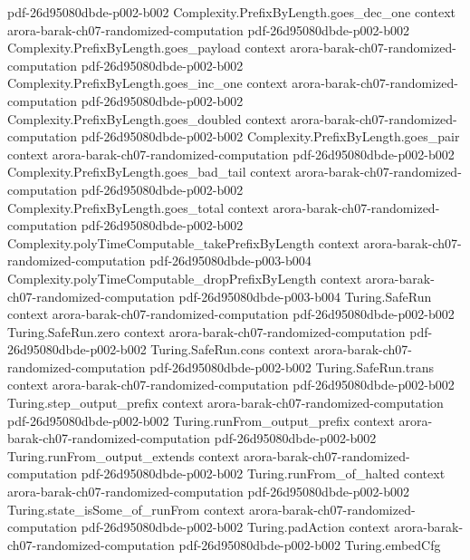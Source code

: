 \begin{theorem}
  {pdf-26d95080dbde-p002-b002}
\proofstep
  {Complexity.PrefixByLength.goes_dec_one}
  {context}
  {arora-barak-ch07-randomized-computation}
  {pdf-26d95080dbde-p002-b002}
\proofstep
  {Complexity.PrefixByLength.goes_payload}
  {context}
  {arora-barak-ch07-randomized-computation}
  {pdf-26d95080dbde-p002-b002}
\proofstep
  {Complexity.PrefixByLength.goes_inc_one}
  {context}
  {arora-barak-ch07-randomized-computation}
  {pdf-26d95080dbde-p002-b002}
\proofstep
  {Complexity.PrefixByLength.goes_doubled}
  {context}
  {arora-barak-ch07-randomized-computation}
  {pdf-26d95080dbde-p002-b002}
\proofstep
  {Complexity.PrefixByLength.goes_pair}
  {context}
  {arora-barak-ch07-randomized-computation}
  {pdf-26d95080dbde-p002-b002}
\proofstep
  {Complexity.PrefixByLength.goes_bad_tail}
  {context}
  {arora-barak-ch07-randomized-computation}
  {pdf-26d95080dbde-p002-b002}
\proofstep
  {Complexity.PrefixByLength.goes_total}
  {context}
  {arora-barak-ch07-randomized-computation}
  {pdf-26d95080dbde-p002-b002}
\proofstep
  {Complexity.polyTimeComputable_takePrefixByLength}
  {context}
  {arora-barak-ch07-randomized-computation}
  {pdf-26d95080dbde-p003-b004}
\proofstep
  {Complexity.polyTimeComputable_dropPrefixByLength}
  {context}
  {arora-barak-ch07-randomized-computation}
  {pdf-26d95080dbde-p003-b004}
\proofstep
  {Turing.SafeRun}
  {context}
  {arora-barak-ch07-randomized-computation}
  {pdf-26d95080dbde-p002-b002}
\proofstep
  {Turing.SafeRun.zero}
  {context}
  {arora-barak-ch07-randomized-computation}
  {pdf-26d95080dbde-p002-b002}
\proofstep
  {Turing.SafeRun.cons}
  {context}
  {arora-barak-ch07-randomized-computation}
  {pdf-26d95080dbde-p002-b002}
\proofstep
  {Turing.SafeRun.trans}
  {context}
  {arora-barak-ch07-randomized-computation}
  {pdf-26d95080dbde-p002-b002}
\proofstep
  {Turing.step_output_prefix}
  {context}
  {arora-barak-ch07-randomized-computation}
  {pdf-26d95080dbde-p002-b002}
\proofstep
  {Turing.runFrom_output_prefix}
  {context}
  {arora-barak-ch07-randomized-computation}
  {pdf-26d95080dbde-p002-b002}
\proofstep
  {Turing.runFrom_output_extends}
  {context}
  {arora-barak-ch07-randomized-computation}
  {pdf-26d95080dbde-p002-b002}
\proofstep
  {Turing.runFrom_of_halted}
  {context}
  {arora-barak-ch07-randomized-computation}
  {pdf-26d95080dbde-p002-b002}
\proofstep
  {Turing.state_isSome_of_runFrom}
  {context}
  {arora-barak-ch07-randomized-computation}
  {pdf-26d95080dbde-p002-b002}
\proofstep
  {Turing.padAction}
  {context}
  {arora-barak-ch07-randomized-computation}
  {pdf-26d95080dbde-p002-b002}
\proofstep
  {Turing.embedCfg}

\end{theorem}
